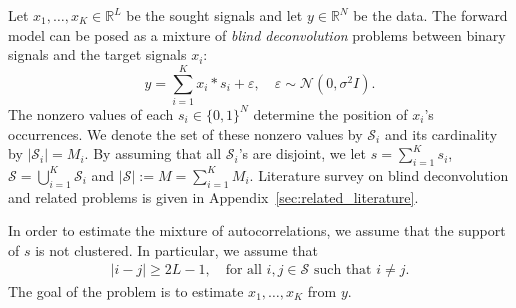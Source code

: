 \documentclass[english,11pt]{article}
\newcommand{\1}{\mathbf{1}}
\numberwithin{equation}{section}
\theoremstyle{plain}
\theoremstyle{definition}
\theoremstyle{remark}
\theoremstyle{plain}
\theoremstyle{remark}
\theoremstyle{plain}
\theoremstyle{plain}
\newcommand{\RL}{\mathbb{R}^L}
\newcommand{\RN}{\mathbb{R}^N}
\newcommand{\SNR}{\ensuremath{\textsf{SNR}}}
\begin{document}
Let $x_1,\ldots,x_K\in\RL$ be the sought signals and let $y\in\RN$ be the data. 
The forward model can be posed as a mixture of \emph{blind deconvolution} problems between binary signals and the target signals $x_i$:
\begin{equation} \label{eq:model}
y = \sum_{i=1}^K x_i\ast s_i + \varepsilon,\quad \varepsilon\sim\mathcal{N}(0,\sigma^2 I).
\end{equation}
The nonzero values of each  $s_i\in\{0,1\}^N$ determine the position of $x_i$'s occurrences. 
We denote the set of these nonzero values by 
 $\mathcal{S}_i$ and its cardinality by $\vert \mathcal{S}_i\vert = M_i$. 
By assuming that all $\mathcal{S}_i$'s are disjoint,  we let $s = \sum_{i=1}^Ks_i$, $\mathcal{S} = \bigcup_{i=1}^{K} \mathcal{S}_i$ and  $\vert \mathcal{S}\vert :=M =  \sum_{i=1}^{K}M_i$.  %
 Literature survey on blind deconvolution and related problems is given in Appendix~\ref{sec:related_literature}.

In order to estimate the mixture of autocorrelations, we assume that the support of $s$ is not clustered. In particular, we assume that
\begin{align}
  \vert i-j \vert\geq 2L-1,   \quad \text{for all } i,j\in\mathcal{S} \text{ such that } i\neq j.
  \label{eq:spacing}
\end{align}
The goal of the problem is to estimate $x_1,\ldots,x_K$ from $y$.


%
%
\end{document}
